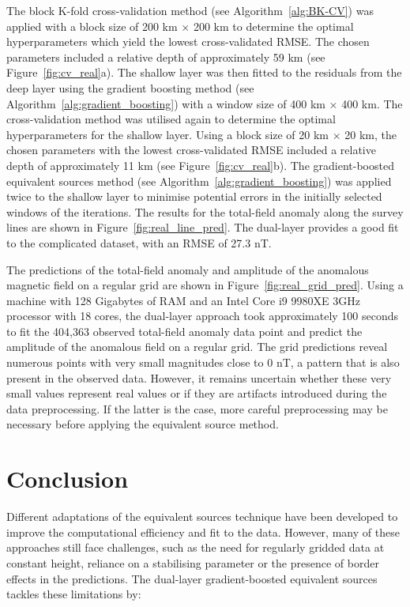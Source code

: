 The block K-fold cross-validation method (see Algorithm~\ref{alg:BK-CV}) was applied with a block size of 200 km $\times$ 200 km to determine the optimal hyperparameters which yield the lowest cross-validated RMSE. The chosen parameters included a relative depth of approximately 59 km (see Figure~\ref{fig:cv_real}a). The shallow layer was then fitted to the residuals from the deep layer using the gradient boosting method (see Algorithm~\ref{alg:gradient_boosting}) with a window size of 400 km $\times$ 400 km. The cross-validation method was utilised again to determine the optimal hyperparameters for the shallow layer. Using a block size of 20 km $\times$ 20 km, the chosen parameters with the lowest cross-validated RMSE included a relative depth of approximately 11 km (see Figure~\ref{fig:cv_real}b). The gradient-boosted equivalent sources method (see Algorithm~\ref{alg:gradient_boosting}) was applied twice to the shallow layer to minimise potential errors in the initially selected windows of the iterations. The results for the total-field anomaly along the survey lines are shown in Figure~\ref{fig:real_line_pred}. The dual-layer provides a good fit to the complicated dataset, with an RMSE of 27.3 nT.

The predictions of the total-field anomaly and amplitude of the anomalous magnetic field on a regular grid are shown in Figure~\ref{fig:real_grid_pred}. Using a machine with 128 Gigabytes of RAM and an Intel Core i9 9980XE 3GHz processor with 18 cores, the dual-layer approach took approximately 100 seconds to fit the 404,363 observed total-field anomaly data point and predict the amplitude of the anomalous field on a regular grid. The grid predictions reveal numerous points with very small magnitudes close to 0 nT, a pattern that is also present in the observed data. However, it remains uncertain whether these very small values represent real values or if they are artifacts introduced during the data preprocessing. If the latter is the case, more careful preprocessing may be necessary before applying the equivalent source method.



\section{Conclusion}

Different adaptations of the equivalent sources technique have been developed to improve the computational efficiency and fit to the data. However, many of these approaches still face challenges, such as the need for regularly gridded data at constant height, reliance on a stabilising parameter or the presence of border effects in the predictions. The dual-layer gradient-boosted equivalent sources tackles these limitations by:

